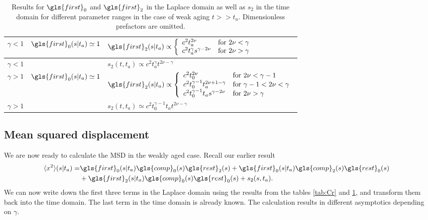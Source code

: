 \begin{center}
\begin{table}[h!]
 \begin{tabular}{||l|l|l||}
 \hline \hline
\rule[-4mm]{0cm}{1cm}   $\gamma<1$ & $\gls{first}_0(s|t_a) \simeq 1$ & $\gls{first}_2(s|t_a) \propto \left\{
\begin{array}{ll}
c^2 t_a^{2\nu}  & \mbox{for } 2\nu < \gamma \\
c^2 t_a^\gamma s^{\gamma-2\nu} & \mbox{for } 2\nu > \gamma
\end{array} \right. $\\ \hline
\rule[-4mm]{0cm}{1cm} $\gamma<1$ & $  $ & $s_2(t,t_a) \propto c^2 t_a^\gamma t^{2\nu -\gamma} $ \\ \hline
\rule[-4mm]{0cm}{1cm} $\gamma>1$ & $\gls{first}_0(s|t_a) \simeq 1$ & $\gls{first}_2(s|t_a) \propto \left\{
 \begin{array}{ll}
c^2  t_0^{2\nu} & \mbox{for } 2\nu < \gamma  -1     \\
  c^2  t_0^{\gamma-1} t_a^{2\nu +1- \gamma } & \mbox{for } \gamma-1 < 2\nu < \gamma \\
 c^2 t_0^{\gamma-1} t_a s^{\gamma - 2\nu} & \mbox{for } 2\nu > \gamma
 \end{array}
 \right. $ \\ \hline
\rule[-4mm]{0cm}{1cm} $\gamma>1$& & $s_2(t,t_a) \simeq c^2 t_0^{\gamma-1}  t_a t^{2\nu-\gamma}$ \\ \hline \hline
\end{tabular}
\caption{Results for $\gls{first}_0$ and $\gls{first}_2$ in the Laplace domain as well as $s_2$ in the time domain for different parameter ranges in the case of weak aging $t>>t_a$. Dimensionless prefactors are omitted. \label{tab:sFweakAging}}
\end{table}
\end{center}



\subsection*{Mean squared displacement}

We are now ready to calculate the MSD in the weakly aged case. Recall our earlier result
\begin{align}
\langle x^2 \rangle (s|t_a) =&  \gls{first}_0(s|t_a) \gls{comp}_0(s) \gls{rest}_2(s) + \gls{first}_0(s|t_a) \gls{comp}_2(s) \gls{rest}_0(s)  \nonumber \\
& + \gls{first}_2(s|t_a) \gls{comp}_0(s) \gls{rest}_0(s) + s_{2}(s,t_a) .
\end{align}
We can now write down the first three terms in the Laplace domain using the results from the tables \ref{tab:Cr} and \ref{tab:sFweakAging}, and transform them back into the time domain.
The last term in the time domain is already known. The calculation results in different asymptotics depending on $\gamma$.


